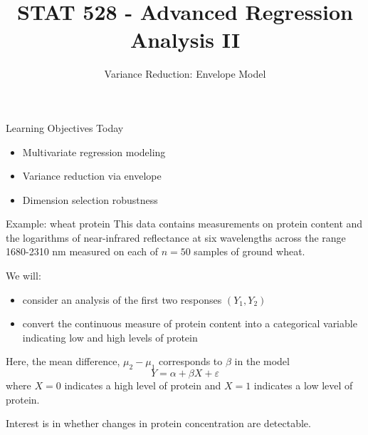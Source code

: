 \documentclass[
  ignorenonframetext,
]{beamer}
\title{STAT 528 - Advanced Regression Analysis II}
\author{Variance Reduction: Envelope Model}
\date{}
\institute{Daniel J. Eck\\
Department of Statistics\\
University of Illinois}
\providecommand{\tightlist}{%
  \setlength{\itemsep}{0pt}\setlength{\parskip}{0pt}}
\begin{document}
\frame{\titlepage}

\begin{frame}
\newcommand{\Var}{\mathrm{Var}}
\newcommand{\Prob}{\mathbb{P}}
\newcommand{\R}{\mathbb{R}}
\newcommand{\E}{\mathrm{E}}
\newcommand{\Y}{\mathbb{Y}}
\newcommand{\X}{\mathbb{X}}
\end{frame}

\begin{frame}{Learning Objectives Today}
\protect\hypertarget{learning-objectives-today}{}
\begin{itemize}
\tightlist
\item
  Multivariate regression modeling
\item
  Variance reduction via envelope
\item
  Dimension selection robustness
\end{itemize}
\end{frame}

\begin{frame}{Example: wheat protein}
\protect\hypertarget{example-wheat-protein}{}
This data contains measurements on protein content and the logarithms of
near-infrared reflectance at six wavelengths across the range 1680-2310
nm measured on each of \(n = 50\) samples of ground wheat.

We will:

\begin{itemize}
\tightlist
\item
  consider an analysis of the first two responses \((Y_1,Y_2)\)
\item
  convert the continuous measure of protein content into a categorical
  variable indicating low and high levels of protein
\end{itemize}

Here, the mean difference, \(\mu_2 - \mu_1\) corresponds to \(\beta\) in
the model \[
  Y = \alpha + \beta X + \varepsilon
\] where \(X = 0\) indicates a high level of protein and \(X = 1\)
indicates a low level of protein.

Interest is in whether changes in protein concentration are detectable.
\end{frame}
\end{document}
